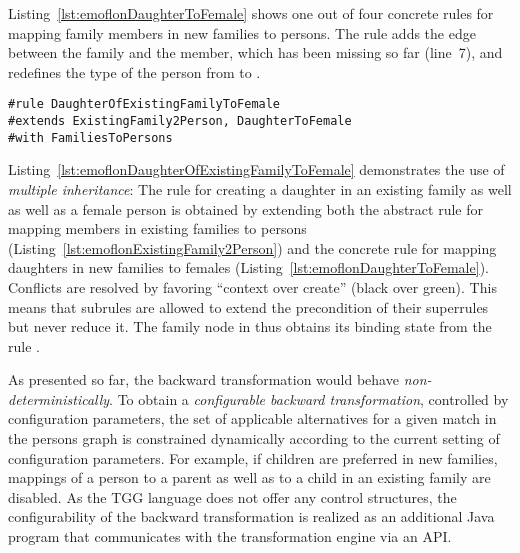 Listing~\ref{lst:emoflonDaughterToFemale} shows one out of four concrete rules for mapping family members in new families to persons.
The rule adds the edge between the family and the member, which has been missing so far (line~7), and redefines the type of the person from  to .

\begin{lstlisting}[label={lst:emoflonDaughterOfExistingFamilyToFemale}, float=tb!, language=emoflon, caption={Mapping daughters in existing families to females}]
#rule DaughterOfExistingFamilyToFemale
#extends ExistingFamily2Person, DaughterToFemale
#with FamiliesToPersons
\end{lstlisting}

Listing~\ref{lst:emoflonDaughterOfExistingFamilyToFemale} demonstrates the use of \emph{multiple inheritance}: The rule for creating a daughter in an existing family as well as well as a female person is obtained by extending both the abstract rule for mapping members in existing families to persons (Listing~\ref{lst:emoflonExistingFamily2Person}) and the concrete rule for mapping daughters in new families to females (Listing~\ref{lst:emoflonDaughterToFemale}).
Conflicts are resolved by favoring ``context over create'' (black over green).
This means that subrules are allowed to extend the precondition of their superrules but never reduce it.
The family node  in  thus obtains its binding state from the rule .

As presented so far, the backward transformation would behave \emph{non-deterministically}. To obtain a \emph{configurable backward transformation}, controlled by configuration parameters, the set of applicable alternatives for a given match in the persons graph is constrained dynamically according to the current setting of configuration parameters.
For example, if children are preferred in new families, mappings of a person to a parent as well as to a child in an existing family are disabled.
As the TGG language does not offer any control structures, the configurability of the backward transformation is realized as an additional Java program that communicates with the transformation engine via an API. 

